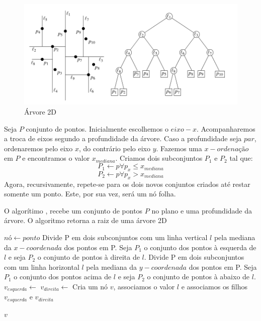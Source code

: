 \begin{figure}[htb]
    \caption{\label{fig:Fig_3} Árvore 2D}
    \begin{center}
        \includegraphics{images/kd_tree1.png}
    \end{center}
\end{figure}


Seja $P$ conjunto de pontos. Inicialmente escolhemos o $eixo-x$. Acompanharemos a troca de eixos segundo a profundidade da árvore.
Caso a profundidade seja $par$, ordenaremos pelo eixo $x$, do contrário pelo eixo $y$.
Fazemos uma $x-ordenação$ em $P$ e encontramos o valor $x_{mediana}$.
Criamos dois subconjuntos $P_1$ e $P_2$ tal que:
    \[P_1 \leftarrow p \forall p_{x} \leq x_{mediana} \]
    \[P_2 \leftarrow p \forall p_{x} > x_{mediana} \]
Agora, recursivamente, repete-se para os dois novos conjuntos criados até restar somente um ponto. Este, por sua vez, será um nó folha.

\begin{algorithm}
    \caption{O algorítimo , recebe um conjunto de pontos $P$ no plano e uma profundidade da árvore.
    O algoritmo retorna a raiz de uma árvore 2D}
    \begin{algorithmic}[1]
            \Return $nó \leftarrow ponto$
        \Else
            \State
                Divide P em dois subconjuntos com um linha vertical $l$ pela mediana da $x-coordenada$
                dos pontos em P. Seja $P_1$ o conjunto dos pontos à esquerda de $l$ e seja
                $P_2$ o conjunto de pontos à direita de $l$.
            \Else
            \State
                Divide P em dois subconjuntos com um linha horizontal $l$ pela mediana da $y-coordenada$
                dos pontos em P. Seja $P_1$ o conjunto dos pontos acima de $l$ e seja
                $P_2$ o conjunto de pontos à abaixo de $l$.
            \EndIf
        \EndIf
        \State $v_{esquerda} \leftarrow $ 
        \State $v_{direita} \leftarrow $ 
        \State Cria um nó $v$, associamos o valor $l$ e associamos os filhos $v_{esquerda}$ e $v_{direita}$ 

        \Return $v$
        \EndFunction
    \end{algorithmic}
\end{algorithm}

